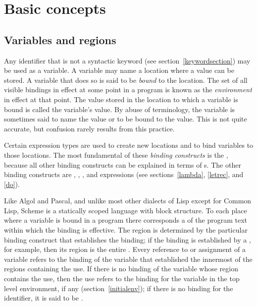 \chapter{Basic concepts}
\label{basicchapter}

\section{Variables and regions}
\label{specialformsection}
\label{variablesection}

Any identifier that is not a syntactic keyword (see
section~\ref{keywordsection}) may be used as a variable.  A variable may name a
location where a value can be stored.  A variable that does so is said
to be {\em bound} to the location.  The set of all visible
bindings in effect at some point in a program is
known as the {\em environment} in effect at that point.  The value
stored in the location to which a variable is bound is called the
variable's value.  By abuse of terminology, the variable is sometimes
said to name the value or to be bound to the value.  This is not quite
accurate, but confusion rarely results from this practice.



\vest Certain expression types are used to create new locations and to
bind variables to those locations.  The most fundamental of these {\em
binding constructs} is the
\lambdaexp{}\index{\lambdaexp{}}, because all other binding constructs
can be explained in terms of \lambdaexp{}s.  The other binding
constructs are , , , and 
expressions (see sections~\ref{lambda}, \ref{letrec}, and \ref{do}).


\vest Like Algol and Pascal, and unlike most other dialects of Lisp
except for Common Lisp, Scheme is a statically scoped language with
block structure.  To each place where a variable is bound in a program
there corresponds a  of the program text within which
the binding is effective.  The region is determined by the particular
binding construct that establishes the binding; if the binding is
established by a \lambdaexp{}, for example, then its region
is the entire \lambdaexp{}.  Every reference to or assignment of a
variable refers to the binding of the variable that established the
innermost of the regions containing the use.  If there is no binding of
the variable whose region contains the use, then the use refers to the
binding for the variable in the top level environment, if any
(section~\ref{initialenv}); if there is no binding for the identifier,
it is said to be .

